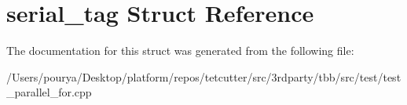 \hypertarget{structserial__tag}{}\section{serial\+\_\+tag Struct Reference}
\label{structserial__tag}


The documentation for this struct was generated from the following file\+:\begin{DoxyCompactItemize}
\item 
/\+Users/pourya/\+Desktop/platform/repos/tetcutter/src/3rdparty/tbb/src/test/test\+\_\+parallel\+\_\+for.\+cpp\end{DoxyCompactItemize}

